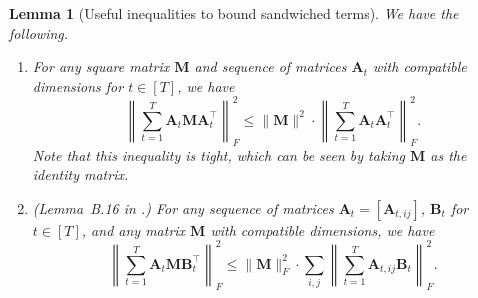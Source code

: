 \documentclass[aos]{imsart}
\theoremstyle{plain}
\newtheorem{lemma}[theorem]{Lemma}
\theoremstyle{definition}
\def\bA{\mathbf{A}}
\def\bB{\mathbf{B}}
\def\bM{\mathbf{M}}
\def\trans{\intercal}
\begin{document}
\begin{lemma}[Useful inequalities to bound sandwiched terms]\label{lemma: inequality_sandwich}
We have the following.
\begin{enumerate}[itemsep=0pt, label = (\alph*), left = 0pt]
    \item For any square matrix $\bM$ and sequence of matrices $\bA_t$ with compatible dimensions for $t\in[T]$, we have
    \[
    \left\| \sum_{t=1}^T \bA_t \bM \bA_t^\trans \right\|_F^2 \leq \|\bM\|^2 \cdot \left\| \sum_{t=1}^T \bA_t \bA_t^\trans \right\|_F^2 .
    \]
    Note that this inequality is tight, which can be seen by taking $\bM$ as the identity matrix.
    \item (Lemma~B.16 in \cite{Barigozzietal2025_robust}.) For any sequence of matrices $\bA_t=[\bA_{t,ij}]$, $\bB_t$ for $t\in[T]$, and any matrix $\bM$ with compatible dimensions, we have
    \[
    \left\| \sum_{t=1}^T \bA_t \bM \bB_t^\trans \right\|_F^2 \leq \|\bM\|_F^2 \cdot \sum_{i,j} \left\| \sum_{t=1}^T \bA_{t,ij} \bB_t \right\|_F^2 .
    \]
\end{enumerate}
\end{lemma}
\end{document}
